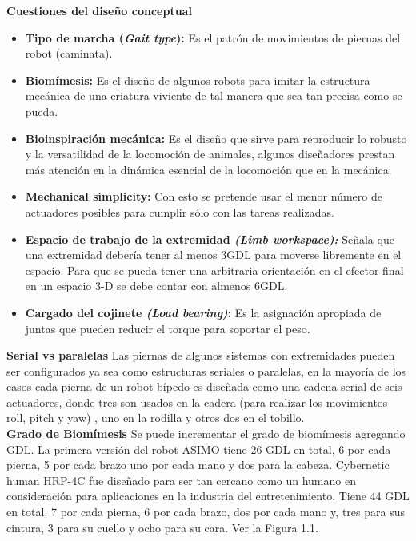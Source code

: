 \documentclass{book}
\begin{document}
\textbf{Cuestiones del diseño conceptual}				
\begin{itemize}
\item \textbf{Tipo de marcha (\textit{Gait type}):} Es el patrón de movimientos de piernas del robot (caminata).

\item \textbf{Biomímesis:} Es el diseño de algunos robots para imitar la estructura mecánica de una criatura viviente de tal manera que sea tan precisa como se pueda.

\item \textbf{Bioinspiración mecánica:} Es el diseño que sirve para reproducir lo robusto y la versatilidad de la locomoción de animales, algunos diseñadores prestan más atención en la dinámica esencial de la locomoción que en la mecánica.

\item \textbf{Mechanical simplicity:} Con esto se pretende usar el menor número de actuadores posibles para cumplir sólo con las tareas realizadas.

\item \textbf{Espacio de trabajo de la extremidad \textit{(Limb workspace):}} Señala que una extremidad debería tener al menos 3GDL para moverse libremente en el espacio. Para que se pueda tener una arbitraria orientación en el efector final en un espacio 3-D se debe contar con almenos 6GDL.

\item \textbf{Cargado del cojinete \textit{(Load bearing)}:} Es la asignación apropiada de juntas que pueden reducir el torque para soportar el peso. 
\end{itemize}


\textbf{Serial vs paralelas}
		Las piernas de algunos sistemas con extremidades pueden ser configurados ya sea como estructuras seriales o paralelas, en la mayoría de los casos cada pierna de un robot bípedo es diseñada como una cadena serial de seis actuadores, donde tres son usados en la cadera (para realizar los movimientos roll, pitch y yaw) , uno en la rodilla y otros dos en el tobillo.\\

		\textbf{Grado de Biomímesis}
	Se puede incrementar el grado de biomímesis agregando GDL.
La primera versión del robot ASIMO tiene 26 GDL en total, 6 por cada pierna, 5 por cada brazo uno por cada mano y dos para la cabeza. 
Cybernetic human HRP-4C fue diseñado para ser tan cercano como un humano en consideración para aplicaciones en la industria del entretenimiento. Tiene 44 GDL en total. 7 por cada pierna, 6 por cada brazo, dos por cada mano y, tres para sus cintura, 3 para su cuello y ocho para su cara. Ver la Figura 1.1. %
\\
\end{document}
